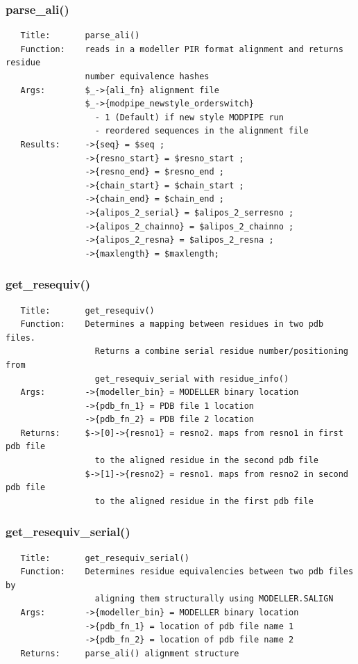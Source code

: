 \documentclass{article}
\begin{document}
\subsubsection*{parse\_ali()\label{pibase::modeller_parse_ali_}}
\begin{verbatim}
   Title:       parse_ali()
   Function:    reads in a modeller PIR format alignment and returns residue
                number equivalence hashes
   Args:        $_->{ali_fn} alignment file
                $_->{modpipe_newstyle_orderswitch}
                  - 1 (Default) if new style MODPIPE run
                  - reordered sequences in the alignment file
   Results:     ->{seq} = $seq ;
                ->{resno_start} = $resno_start ;
                ->{resno_end} = $resno_end ;
                ->{chain_start} = $chain_start ;
                ->{chain_end} = $chain_end ;
                ->{alipos_2_serial} = $alipos_2_serresno ;
                ->{alipos_2_chainno} = $alipos_2_chainno ;
                ->{alipos_2_resna} = $alipos_2_resna ;
                ->{maxlength} = $maxlength;
\end{verbatim}
\subsubsection*{get\_resequiv()\label{pibase::modeller_get_resequiv_}}
\begin{verbatim}
   Title:       get_resequiv()
   Function:    Determines a mapping between residues in two pdb files.
                  Returns a combine serial residue number/positioning from
                  get_resequiv_serial with residue_info()
   Args:        ->{modeller_bin} = MODELLER binary location
                ->{pdb_fn_1} = PDB file 1 location
                ->{pdb_fn_2} = PDB file 2 location
   Returns:     $->[0]->{resno1} = resno2. maps from resno1 in first pdb file
                  to the aligned residue in the second pdb file
                $->[1]->{resno2} = resno1. maps from resno2 in second pdb file
                  to the aligned residue in the first pdb file
\end{verbatim}
\subsubsection*{get\_resequiv\_serial()\label{pibase::modeller_get_resequiv_serial_}}
\begin{verbatim}
   Title:       get_resequiv_serial()
   Function:    Determines residue equivalencies between two pdb files by
                  aligning them structurally using MODELLER.SALIGN
   Args:        ->{modeller_bin} = MODELLER binary location
                ->{pdb_fn_1} = location of pdb file name 1
                ->{pdb_fn_2} = location of pdb file name 2
   Returns:     parse_ali() alignment structure
\end{verbatim}
\clearpage
\end{document}
